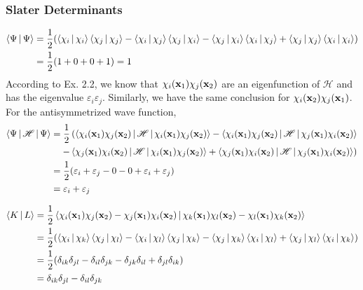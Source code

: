 \documentclass[a4paper]{article}
\begin{document}
\subsubsection{Slater Determinants}
\begin{equation}\label{key}
\begin{aligned}
\Braket{\Psi | \Psi} 
&= \dfrac{1}{2}\qty(\Braket{\chi_i|\chi_i}\Braket{\chi_j|\chi_j} - \Braket{\chi_i|\chi_j}\Braket{\chi_j|\chi_i} - \Braket{\chi_j|\chi_i}\Braket{\chi_i|\chi_j} + \Braket{\chi_j|\chi_j}\Braket{\chi_i|\chi_i})\\
&= \dfrac{1}{2}(1+0+0+1) = 1
\end{aligned}
\end{equation}
According to Ex. 2.2, we know that $ \chi_i(\vb{x}_1)\chi_j(\vb{x}_2) $ are an eigenfunction of $ \mathscr{H} $ and has the eigenvalue $ \varepsilon_i \varepsilon_j $. Similarly, we have the same conclusion for $ \chi_i(\vb{x}_2)\chi_j(\vb{x}_1) $.\\
For the antisymmetrized wave function,
\begin{equation}\label{key}
\begin{aligned}
\Braket{\Psi | \mathscr{H} | \Psi} &= \dfrac{1}{2}\left(\Braket{\chi_i(\vb{x}_1)\chi_j(\vb{x}_2) | \mathscr{H} | \chi_i(\vb{x}_1)\chi_j(\vb{x}_2)} - \Braket{\chi_i(\vb{x}_1)\chi_j(\vb{x}_2) | \mathscr{H} | \chi_j(\vb{x}_1)\chi_i(\vb{x}_2)}\right.\\
&\left. \quad - \Braket{\chi_j(\vb{x}_1)\chi_i(\vb{x}_2) | \mathscr{H} | \chi_i(\vb{x}_1)\chi_j(\vb{x}_2)} + \Braket{\chi_j(\vb{x}_1)\chi_i(\vb{x}_2) | \mathscr{H} | \chi_j(\vb{x}_1)\chi_i(\vb{x}_2)}\right)\\
&= \dfrac{1}{2}\qty(\varepsilon_i + \varepsilon_j - 0 - 0 + \varepsilon_i + \varepsilon_j)\\
&= \varepsilon_i + \varepsilon_j
\end{aligned}
\end{equation}

\begin{equation}\label{key}
\begin{aligned}
\Braket{K | L} &= \dfrac{1}{2}\Braket{\chi_i(\vb{x}_1)\chi_j(\vb{x}_2) - \chi_j(\vb{x}_1)\chi_i(\vb{x}_2) | \chi_k(\vb{x}_1)\chi_l(\vb{x}_2) - \chi_l(\vb{x}_1)\chi_k(\vb{x}_2)}\\
&= \dfrac{1}{2}\qty(\Braket{\chi_i|\chi_k}\Braket{\chi_j|\chi_l} - \Braket{\chi_i|\chi_l}\Braket{\chi_j|\chi_k} - \Braket{\chi_j|\chi_k}\Braket{\chi_i|\chi_l} + \Braket{\chi_j|\chi_l}\Braket{\chi_i|\chi_k})\\
&= \dfrac{1}{2}\qty(\delta_{ik}\delta_{jl} - \delta_{il}\delta_{jk} - \delta_{jk}\delta_{il} + \delta_{jl}\delta_{ik})\\
&= \delta_{ik}\delta_{jl} - \delta_{il}\delta_{jk}
\end{aligned}
\end{equation}
\end{document}
